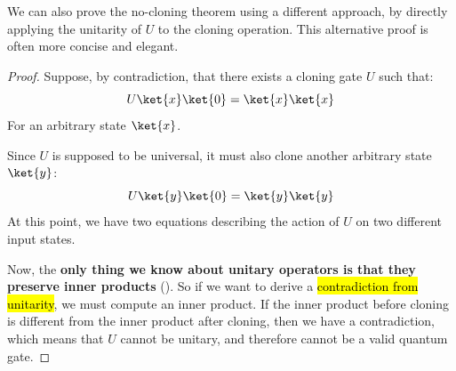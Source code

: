 \begin{deepeningbox}\label{deep-box:alternative-proof-no-cloning}
    We can also prove the no-cloning theorem using a different approach, by directly applying the unitarity of $U$ to the cloning operation. This alternative proof is often more concise and elegant.
    
    \begin{proof}
        Suppose, by contradiction, that there exists a cloning gate $U$ such that:
        \begin{equation*}
            U\ket{x}\ket{0}=\ket{x}\ket{x}
        \end{equation*}
        For an arbitrary state $\ket{x}$.

        \highspace
        Since $U$ is supposed to be universal, it must also clone another arbitrary state $\ket{y}$:
        \begin{equation*}
            U\ket{y}\ket{0}=\ket{y}\ket{y}
        \end{equation*}
        At this point, we have two equations describing the action of $U$ on two different input states.

        \highspace
        Now, the \textbf{only thing we know about unitary operators is that they preserve inner products} (). So if we want to derive a \hl{contradiction from unitarity}, we must compute an inner product. If the inner product before cloning is different from the inner product after cloning, then we have a contradiction, which means that $U$ cannot be unitary, and therefore cannot be a valid quantum gate.


\end{proof}
\end{deepeningbox}
